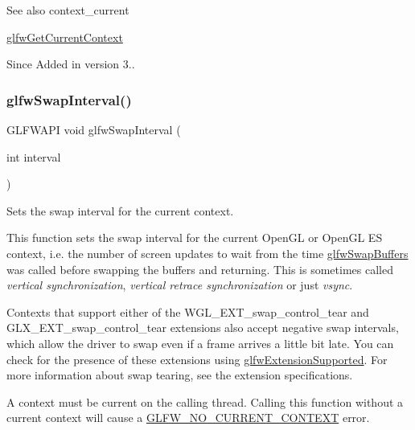 \begin{DoxySeeAlso}{See also}
context\+\_\+current 

\hyperlink{group__context_gac28d98c655377d81a516bf5ef90780c8}{glfw\+Get\+Current\+Context}
\end{DoxySeeAlso}
\begin{DoxySince}{Since}
Added in version 3.. 
\end{DoxySince}
\mbox{\label{group__context_ga12a595c06947cec4967c6e1f14210a8a}} 
\subsubsection{\texorpdfstring{glfw\+Swap\+Interval()}{glfwSwapInterval()}}
{\footnotesize\ttfamily G\+L\+F\+W\+A\+PI void glfw\+Swap\+Interval (\begin{DoxyParamCaption}\item[{int}]{interval }\end{DoxyParamCaption})}



Sets the swap interval for the current context. 

This function sets the swap interval for the current Open\+GL or Open\+GL ES context, i.\+e. the number of screen updates to wait from the time \hyperlink{group__window_gafb827800eedbfcbc97b1e5408df668d7}{glfw\+Swap\+Buffers} was called before swapping the buffers and returning. This is sometimes called {\itshape vertical synchronization}, {\itshape vertical retrace synchronization} or just {\itshape vsync}.

Contexts that support either of the {\ttfamily W\+G\+L\+\_\+\+E\+X\+T\+\_\+swap\+\_\+control\+\_\+tear} and {\ttfamily G\+L\+X\+\_\+\+E\+X\+T\+\_\+swap\+\_\+control\+\_\+tear} extensions also accept negative swap intervals, which allow the driver to swap even if a frame arrives a little bit late. You can check for the presence of these extensions using \hyperlink{group__context_ga9a28c712d35f9e43534e1d03b051c04c}{glfw\+Extension\+Supported}. For more information about swap tearing, see the extension specifications.

A context must be current on the calling thread. Calling this function without a current context will cause a \hyperlink{group__errors_gaa8290386e9528ccb9e42a3a4e16fc0d0}{G\+L\+F\+W\+\_\+\+N\+O\+\_\+\+C\+U\+R\+R\+E\+N\+T\+\_\+\+C\+O\+N\+T\+E\+XT} error.

